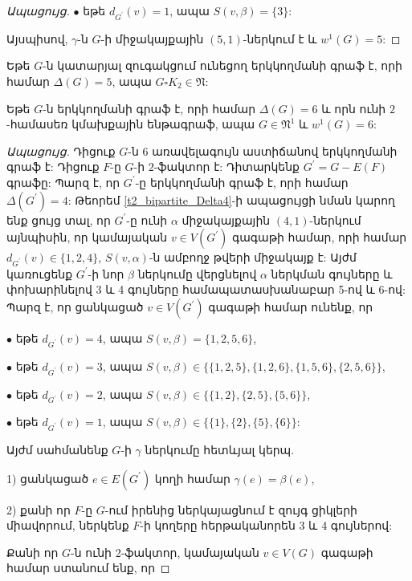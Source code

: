 \begin{hide}
\begin{proof}[Ապացույց]
$\bullet$ եթե $d_{G^{\prime}}(v)=1$, ապա $S(v,\beta) = \{3\}$:

Այսպիսով, $\gamma$-ն $G$-ի միջակայքային $(5,1)$-ներկում է և $w^1(G)=5$:
\end{proof}

\begin{corollary}
\label{c2_bipartite_Delta5_nopm} Եթե $G$-ն կատարյալ զուգակցում ունեցող երկկողմանի գրաֆ է, որի համար $\Delta(G)=5$, ապա $G \square K_2 \in \mathfrak{N}$:
\end{corollary}

\begin{theorem}
\label{t2_bipartite_Delta6_2factor} Եթե $G$-ն երկկողմանի գրաֆ է, որի համար $\Delta(G)=6$ և որն ունի 
$2$-համասեռ կմախքային ենթագրաֆ, ապա $G\in \mathfrak{N}^{1}$ և $w^{1}(G)=6$:
\end{theorem}
\begin{proof}[Ապացույց]
Դիցուք $G$-ն 6 առավելագույն աստիճանով երկկողմանի գրաֆ է:
Դիցուք $F$-ը $G$-ի $2$-ֆակտոր է: Դիտարկենք $G^{\prime}=G-E(F)$ գրաֆը:
Պարզ է, որ $G^{\prime}$-ը երկկողմանի գրաֆ է, որի համար
$\Delta(G^{\prime})=4$: Թեորեմ \ref{t2_bipartite_Delta4}-ի ապացույցի նման կարող ենք ցույց տալ, որ $G^{\prime}$-ը ունի $\alpha$ միջակայքային
$(4,1)$-ներկում այնպիսին, որ կամայական $v\in V(G^{\prime})$ գագաթի համար, որի համար $d_{G^{\prime}}(v)\in \{1,2,4\}$, $S(v,\alpha)$-ն ամբողջ թվերի միջակայք է: Այժմ կառուցենք $G^{\prime}$-ի նոր $\beta$ ներկումը վերցնելով $\alpha$ ներկման գույները և փոխարինելով 3 և 4 գույները համապատասխանաբար 5-ով և 6-ով: Պարզ է, որ ցանկացած $v\in
V(G^{\prime})$ գագաթի համար ունենք, որ

$\bullet$ եթե $d_{G^{\prime}}(v)=4$, ապա $S(v,\beta)=
\{1,2,5,6\}$,

$\bullet$ եթե $d_{G^{\prime}}(v)=3$, ապա
$S(v,\beta)\in \{\{1,2,5\},\{1,2,6\},\{1,5,6\},\{2,5,6\}\}$,

$\bullet$ եթե $d_{G^{\prime}}(v)=2$, ապա $S(v,\beta)\in
\{\{1,2\},\{2,5\},\{5,6\}\}$,

$\bullet$ եթե $d_{G^{\prime}}(v)=1$, ապա $S(v,\beta)\in
\{\{1\},\{2\},\{5\},\{6\}\}$:

Այժմ սահմանենք $G$-ի $\gamma$ ներկումը հետևյալ կերպ.

1) ցանկացած $e\in E(G^{\prime})$ կողի համար $\gamma(e)=\beta(e)$,

2) քանի որ $F$-ը $G$-ում իրենից ներկայացնում է զույգ ցիկլերի միավորում, ներկենք $F$-ի կողերը հերթականորեն 3 և 4 գույներով:

Քանի որ $G$-ն ունի 2-ֆակտոր, կամայական $v\in V(G)$ գագաթի համար ստանում ենք, որ


\end{proof}
\end{hide}
